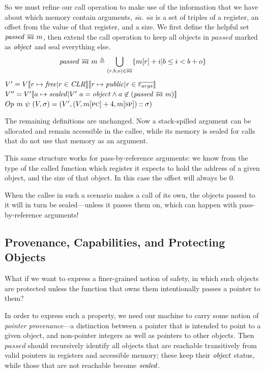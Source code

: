 \documentclass[10pt,conference]{ieeetran}%
\theoremstyle{definition}
\begin{document}
So we must refine our call operation to make use of the information that we have about
which memory contain arguments, \(\overline{sa}\). \(\overline{sa}\) is a set of
triples of a register, an offset from the value of that register, and a size.
We first define the helpful set \(\mathit{passed} ~ \overline{sa} ~ m\),
then extend the call operation to keep all objects in \(\mathit{passed}\) marked
as \(\mathit{object}\) and seal everything else.
%
\[\mathit{passed} ~ \overline{sa} ~ m \triangleq
\bigcup_{(r,b,o) \in \overline{sa}} \{m[r]+i | b \leq i < b+o\}\]
%
             {\(V' = V \llbracket r \mapsto \mathit{free} | r \in \mathit{CLR} \rrbracket
               \llbracket r \mapsto \mathit{public} | r \in \overline{r_{args}} \rrbracket\)}
             {\(V'' = V'\llbracket a \mapsto \mathit{sealed} | V' ~ a = \mathit{object} \land a \not \in (\mathit{passed} ~ \overline{sa} ~ m) \rrbracket\)}
             {\(Op ~ m ~ \psi ~ (V,\sigma) =
               (V',(V, m[\textsc{pc}]+4, m[\textsc{sp}])::\sigma)\)}

The remaining definitions are unchanged. Now a stack-spilled argument can be allocated
and remain accessible in the callee, while its memory is sealed for calls that do not
use that memory as an argument.

This same structure works for pass-by-reference arguments: we know from the type of
the called function which register it expects to hold the address of a given object,
and the size of that object. In this case the offset will always be 0.

When the callee in such a scenario makes a call of its own, the objects passed to it
will in turn be sealed---unless it passes them on, which can happen with pass-by-reference
arguments!

\subsection{Provenance, Capabilities, and Protecting Objects}

What if we want to express a finer-grained notion of safety, in which
such objects are protected unless the function that owns them intentionally
passes a pointer to them?

In order to express such a property, we need our machine to carry some notion
of {\it pointer provenance}---a distinction between a pointer that is intended to
point to a given object, and non-pointer integers as well as pointers to other objects.
Then \(\mathit{passed}\) should recursively identify all objects that
are reachable transitively from valid pointers in registers and accessible memory;
these keep their \(\mathit{object}\) status, while those that are not reachable become \(\mathit{sealed}\).
         


\end{document}
